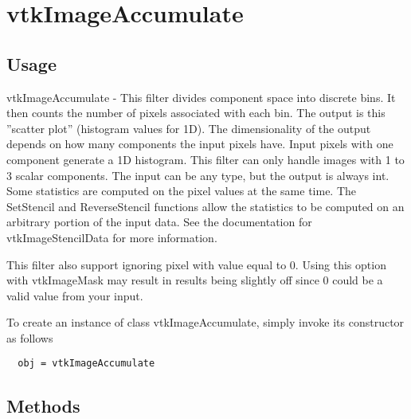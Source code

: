 \section{vtkImageAccumulate}

\subsection{Usage}

 vtkImageAccumulate - This filter divides component space into
 discrete bins.  It then counts the number of pixels associated
 with each bin.  The output is this ''scatter plot'' (histogram values for 1D).
 The dimensionality of the output depends on how many components the
 input pixels have.  Input pixels with one component generate a 1D histogram.
 This filter can only handle images with 1 to 3 scalar components.
 The input can be any type, but the output is always int.
 Some statistics are computed on the pixel values at the same time.
 The SetStencil and ReverseStencil
 functions allow the statistics to be computed on an arbitrary
 portion of the input data.
 See the documentation for vtkImageStencilData for more information.

 This filter also support ignoring pixel with value equal to 0. Using this
 option with vtkImageMask may result in results being slightly off since 0
 could be a valid value from your input.


To create an instance of class vtkImageAccumulate, simply
invoke its constructor as follows
\begin{verbatim}
  obj = vtkImageAccumulate
\end{verbatim}
\subsection{Methods}

